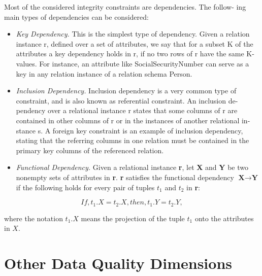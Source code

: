 Most of the considered integrity constraints are dependencies. The follow-
ing main types of dependencies can be considered:

\begin{itemize}
    \item{\textit{Key Dependency.} This is the simplest type of dependency. Given a relation
    instance r, defined over a set of attributes, we say that for a subset K of
    the attributes a key dependency holds in r, if no two rows of r have the
    same K-values. For instance, an attribute like SocialSecurityNumber can
    serve as a key in any relation instance of a relation schema Person.}
    \item{\textit{Inclusion Dependency.} Inclusion dependency is a very common type of
    constraint, and is also known as referential constraint. An inclusion de-
    pendency over a relational instance r states that some columns of r are
    contained in other columns of r or in the instances of another relational in-
    stance s. A foreign key constraint is an example of inclusion dependency,
    stating that the referring columns in one relation must be contained in the
    primary key columns of the referenced relation.}
    \item{\textit{Functional Dependency.} Given a relational instance \textbf{r}, let \textbf{X} and \textbf{Y} be two
    nonempty sets of attributes in \textbf{r}. \textbf{r} satisfies the functional dependency
    ${\textbf{X} \rightarrow \textbf{Y}}$ if the following holds for every pair of tuples \textbf{$t_1$} and \textbf{$t_2$} in \textbf{r}:
    }
\end{itemize}

\begin{equation*}
    \boxed{If, t_1.X = t_2.X, then, t_1.Y = t_2.Y,}
\end{equation*}

where the notation $t_1.X$ means the projection of the tuple $t_1$ onto the
attributes in $X$.

\section{Other Data Quality Dimensions}